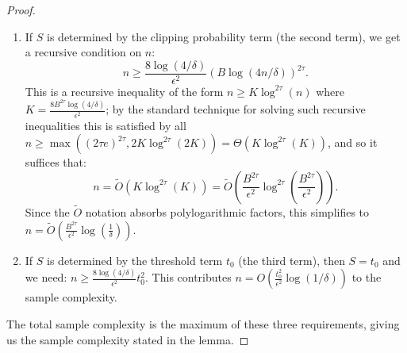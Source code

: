 \documentclass[10pt,a4paper]{amsart}
\begin{document}
\begin{proof}
\begin{enumerate}
\item If $S$ is determined by the clipping probability term (the second term), we get a recursive condition on $n$:
    \[ n \ge \frac{8 \log(4/\delta)}{\epsilon^2} (B \log(4n/\delta))^{2\tau}. \]
    This is a recursive inequality of the form $n \ge K \log^{2\tau}(n)$ where $K = \frac{8 B^{2\tau} \log(4/\delta)}{\epsilon^2}$; by the standard technique for solving such recursive inequalities this is satisfied by all $n \geq \max((2\tau e)^{2\tau}, 2K\log^{2\tau}(2K)) \allowbreak = \Theta(K\log^{2\tau}(K))$, and so it suffices that:
    \[ n = \tilde{O}\left(K \log^{2\tau}(K)\right) = \tilde{O}\left(\frac{B^{2\tau}}{\epsilon^2} \log^{2\tau}\left(\frac{B^{2\tau}}{\epsilon^2}\right)\right). \]
    Since the $\tilde{O}$ notation absorbs polylogarithmic factors, this simplifies to $n = \tilde{O}\left(\frac{B^{2\tau}}{\epsilon^2} \log(\frac 1 \delta)\right)$.
    
    \item If $S$ is determined by the threshold term $t_0$ (the third term), then $S = t_0$ and we need:
    $ n \ge \frac{8 \log(4/\delta)}{\epsilon^2} t_0^2. $
    This contributes $n = O \left(\frac{t_0^2}{\epsilon^2} \log(1/\delta)\right)$ to the sample complexity.
\end{enumerate}
The total sample complexity is the maximum of these three requirements, giving us the sample complexity stated in the lemma. 
\end{proof}
\end{document}
